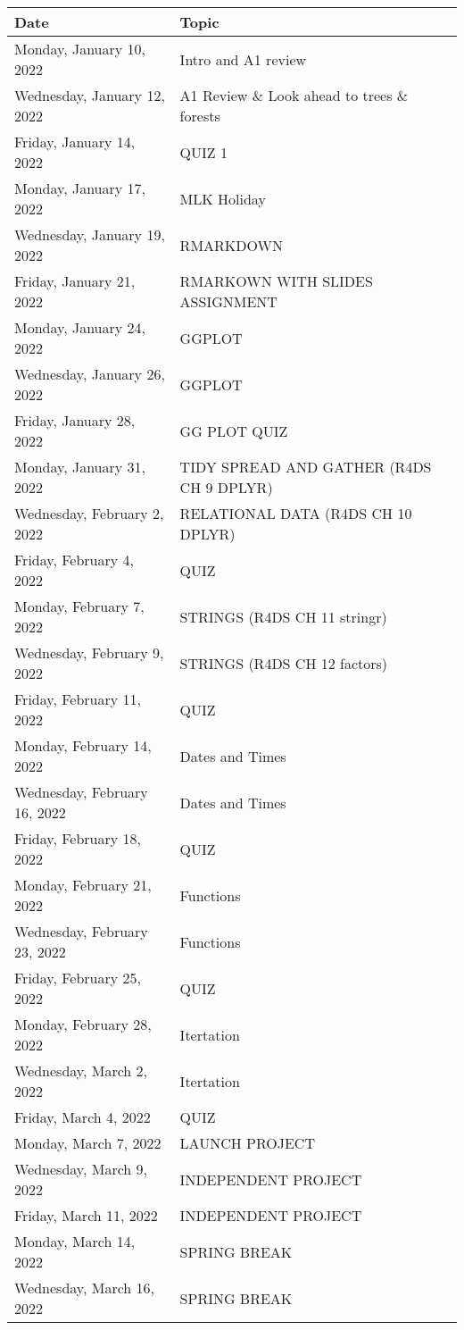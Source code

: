 \documentclass[
]{book}
\theoremstyle{definition}
\theoremstyle{definition}
\theoremstyle{definition}
\theoremstyle{definition}
\theoremstyle{remark}
\begin{document}
\begin{longtable}[]{@{}ll@{}}
\toprule
Date & Topic \\
\midrule
\endhead
Monday, January 10, 2022 & Intro and A1 review \\
Wednesday, January 12, 2022 & A1 Review \& Look ahead to trees \& forests \\
Friday, January 14, 2022 & QUIZ 1 \\
Monday, January 17, 2022 & MLK Holiday \\
Wednesday, January 19, 2022 & RMARKDOWN \\
Friday, January 21, 2022 & RMARKOWN WITH SLIDES ASSIGNMENT \\
Monday, January 24, 2022 & GGPLOT \\
Wednesday, January 26, 2022 & GGPLOT \\
Friday, January 28, 2022 & GG PLOT QUIZ \\
Monday, January 31, 2022 & TIDY SPREAD AND GATHER (R4DS CH 9 DPLYR) \\
Wednesday, February 2, 2022 & RELATIONAL DATA (R4DS CH 10 DPLYR) \\
Friday, February 4, 2022 & QUIZ \\
Monday, February 7, 2022 & STRINGS (R4DS CH 11 stringr) \\
Wednesday, February 9, 2022 & STRINGS (R4DS CH 12 factors) \\
Friday, February 11, 2022 & QUIZ \\
Monday, February 14, 2022 & Dates and Times \\
Wednesday, February 16, 2022 & Dates and Times \\
Friday, February 18, 2022 & QUIZ \\
Monday, February 21, 2022 & Functions \\
Wednesday, February 23, 2022 & Functions \\
Friday, February 25, 2022 & QUIZ \\
Monday, February 28, 2022 & Itertation \\
Wednesday, March 2, 2022 & Itertation \\
Friday, March 4, 2022 & QUIZ \\
Monday, March 7, 2022 & LAUNCH PROJECT \\
Wednesday, March 9, 2022 & INDEPENDENT PROJECT \\
Friday, March 11, 2022 & INDEPENDENT PROJECT \\
Monday, March 14, 2022 & SPRING BREAK \\
Wednesday, March 16, 2022 & SPRING BREAK \\

\end{longtable}
\end{document}
